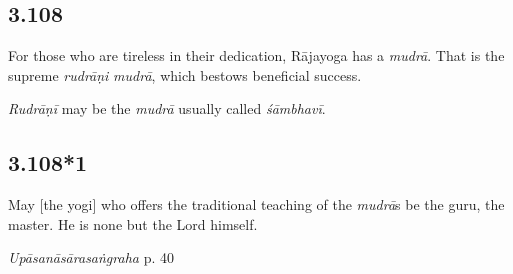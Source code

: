 \begin{ekdosis}
\begin{philcomm}[hp03_107]

\end{philcomm}


\subsection*{3.108}
\begin{translation}[hp03_108]
For those who are tireless in their dedication, Rājayoga has a \emph{mudrā}. That is the supreme \emph{rudrāṇi} \emph{mudrā}, which bestows beneficial success.
\end{translation}



\begin{philcomm}[hp03_108]
\emph{Rudrāṇī} may be the \emph{mudrā} usually called \emph{śāmbhavī}.

\end{philcomm}


\subsection*{3.108*1}
\begin{translation}[hp03_108_1]
May [the yogi] who offers the traditional teaching of the \emph{mudrā}s be the guru, the master. He is none but the Lord himself.
\end{translation}


\begin{testimonia}[hp03_108_1]
\emph{Upāsanāsārasaṅgraha} p. 40 %
\begin{versinnote}
\end{versinnote}
\end{testimonia}


\end{ekdosis}
